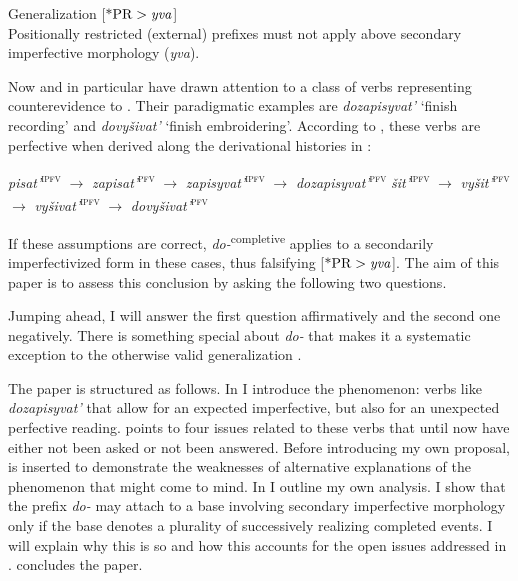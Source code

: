 \documentclass[output=paper,
colorlinks,
citecolor=brown,
newtxmath
]{langscibook}
\begin{document}
\ea\label{tategen}
Generalization [$\text{*PR}>\text{\textit{yva}}$]\\
Positionally restricted (external) prefixes must not apply above secondary imperfective morphology (\textit{yva}).
\z

\noindent Now \citet{Zinova.Filip2015} and in particular \citet{Zinova2016} have drawn attention to a class of verbs representing counterevidence to . Their paradigmatic examples are \textit{dozapisyvat'} `finish recording' and \textit{dovyšivat'} `finish embroidering'. According to \citet{Zinova.Filip2015}, these verbs are perfective when derived along the derivational histories in :

\ea\label{dh1}
\ea \textit{pisat'}\textsuperscript{\textsc{ipfv}} $\rightarrow$ \textit{zapisat'}\textsuperscript{\textsc{pfv}} $\rightarrow$ \textit{zapisyvat'}\textsuperscript{\textsc{ipfv}} $\rightarrow$ \textit{dozapisyvat'}\textsuperscript{\textsc{pfv}}
\ex \textit{šit'}\textsuperscript{\textsc{ipfv}} $\rightarrow$ \textit{vyšit'}\textsuperscript{\textsc{pfv}} $\rightarrow$ \textit{vyšivat'}\textsuperscript{\textsc{ipfv}} $\rightarrow$ \textit{dovyšivat'}\textsuperscript{\textsc{pfv}}
\z\z

\noindent If these assumptions are correct, \textit{do-}\textsuperscript{completive} applies to a secondarily imperfectivized form in these cases, thus falsifying [$\text{*PR}>\text{\textit{yva}}$].
The aim of this paper is to assess this conclusion by asking the following two questions.

\begin{exe}
\ex\label{2questions}
\begin{xlist}
\end{xlist}
\end{exe}

\noindent Jumping ahead, I will answer the first question affirmatively and the second one negatively. There is something special about \textit{do-} that makes it a systematic exception to the otherwise valid generalization .

The paper is structured as follows. In  I introduce the phenomenon: verbs like \textit{dozapisyvat'} that allow for an expected imperfective, but also for an unexpected perfective reading.  points to four issues related to these verbs that until now have either not been asked or not been answered. Before introducing my own proposal,  is inserted to demonstrate the weaknesses of alternative explanations of the phenomenon that might come to mind. In  I outline my own analysis. I show that the prefix \textit{do-} may attach to a base involving secondary imperfective morphology only if the base denotes a plurality of successively realizing completed events.
I will explain why this is so and how this accounts for the open issues addressed in .
 concludes the paper.
\end{document}
